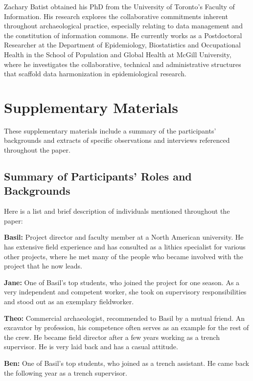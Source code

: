 \documentclass[
]{article}
\begin{document}
Zachary Batist obtained his PhD from the University of Toronto's Faculty
of Information. His research explores the collaborative commitments
inherent throughout archaeological practice, especially relating to data
management and the constitution of information commons. He currently
works as a Postdoctoral Researcher at the Department of Epidemiology,
Biostatistics and Occupational Health in the School of Population and
Global Health at McGill University, where he investigates the
collaborative, technical and administrative structures that scaffold
data harmonization in epidemiological research.

\newpage

\section{Supplementary Materials}\label{supplementary-materials}

These supplementary materials include a summary of the participants'
backgrounds and extracts of specific observations and interviews
referenced throughout the paper.

\subsection{Summary of Participants' Roles and
Backgrounds}\label{summary-of-participants-roles-and-backgrounds}

Here is a list and brief description of individuals mentioned throughout
the paper:

\textbf{Basil:} Project director and faculty member at a North American
university. He has extensive field experience and has consulted as a
lithics specialist for various other projects, where he met many of the
people who became involved with the project that he now leads.

\textbf{Jane:} One of Basil's top students, who joined the project for
one season. As a very independent and competent worker, she took on
supervisory responsibilities and stood out as an exemplary fieldworker.

\textbf{Theo:} Commercial archaeologist, recommended to Basil by a
mutual friend. An excavator by profession, his competence often serves
as an example for the rest of the crew. He became field director after a
few years working as a trench supervisor. He is very laid back and has a
casual attitude.

\textbf{Ben:} One of Basil's top students, who joined as a trench
assistant. He came back the following year as a trench supervisor.
\end{document}
